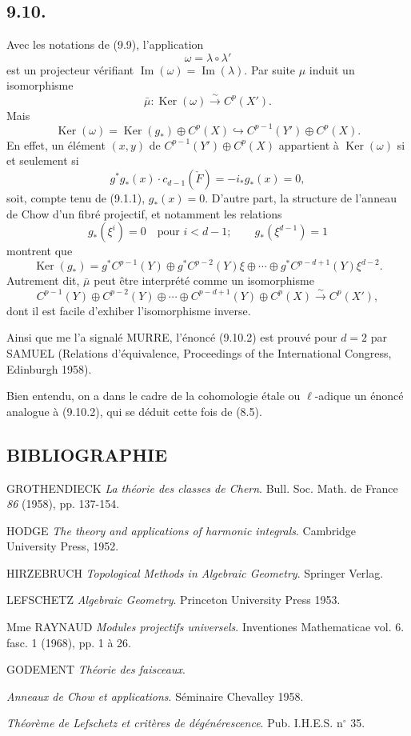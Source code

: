 \documentclass[11pt]{article}
\providecommand{\Ker}{\operatorname{Ker}}
\providecommand{\Ker}{\operatorname{Ker}}
\providecommand{\Ker}{\operatorname{Ker}}
\begin{document}
\subsection*{9.10.}

Avec les notations de (9.9), l'application
\[
\omega=\lambda\circ\lambda'
\]
est un projecteur vérifiant $\operatorname{Im}(\omega)=\operatorname{Im}(\lambda)$. Par suite $\mu$ induit un isomorphisme
\[
\bar\mu:\Ker(\omega)\xrightarrow{\sim}C^p(X').
\]
Mais
\[
\Ker(\omega)=\Ker(g_*)\oplus C^p(X)\hookrightarrow C^{p-1}(Y')\oplus C^p(X).
\tag{9.10.1}
\]
En effet, un élément $(x,y)$ de $C^{p-1}(Y')\oplus C^p(X)$ appartient à $\Ker(\omega)$ si et seulement si
\[
g^*g_*(x)\cdot c_{d-1}(\check F)=-i_*g_*(x)=0,
\]
soit, compte tenu de (9.1.1), $g_*(x)=0$. D'autre part, la structure de l'anneau de Chow d'un fibré projectif, et notamment les relations
\[
g_*(\xi^i)=0\quad\text{pour }i<d-1;\qquad g_*(\xi^{d-1})=1
\]
montrent que
\[
\Ker(g_*)=g^*C^{p-1}(Y)\oplus g^*C^{p-2}(Y)\xi\oplus\cdots\oplus g^*C^{p-d+1}(Y)\xi^{d-2}.
\]
Autrement dit, $\bar\mu$ peut être interprété comme un isomorphisme
\[
C^{p-1}(Y)\oplus C^{p-2}(Y)\oplus\cdots\oplus C^{p-d+1}(Y)\oplus C^p(X)
\xrightarrow{\sim}C^p(X'),
\tag{9.10.2}
\]
dont il est facile d'exhiber l'isomorphisme inverse.

Ainsi que me l'a signalé MURRE, l'énoncé (9.10.2) est prouvé pour $d=2$ par SAMUEL (Relations d'équivalence, Proceedings of the International Congress, Edinburgh 1958).

Bien entendu, on a dans le cadre de la cohomologie étale ou $\ell$-adique un énoncé analogue à (9.10.2), qui se déduit cette fois de (8.5).

\subsection*{BIBLIOGRAPHIE}

\begin{enumerate}[label={[\arabic*]}]
\item GROTHENDIECK \emph{La théorie des classes de Chern}. Bull. Soc. Math. de France \emph{86} (1958), pp. 137-154.
\item HODGE \emph{The theory and applications of harmonic integrals}. Cambridge University Press, 1952.
\item HIRZEBRUCH \emph{Topological Methods in Algebraic Geometry}. Springer Verlag.
\item LEFSCHETZ \emph{Algebraic Geometry}. Princeton University Press 1953.
\item Mme RAYNAUD \emph{Modules projectifs universels}. Inventiones Mathematicae vol. 6. fasc. 1 (1968), pp. 1 à 26.
\item[{[TF]}] GODEMENT \emph{Théorie des faisceaux}.
\item[{[CH]}] \emph{Anneaux de Chow et applications}. Séminaire Chevalley 1958.
\item[{[6]}] \emph{Théorème de Lefschetz et critères de dégénérescence}. Pub. I.H.E.S. n$^\circ$ 35.
\end{enumerate}
\end{document}
